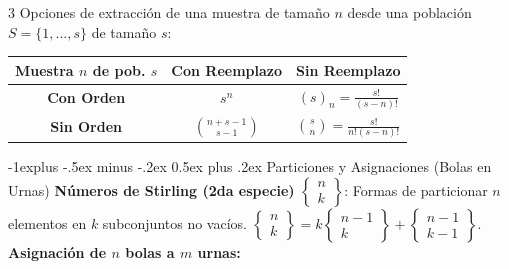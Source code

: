 \documentclass[10pt,landscape]{article}
\makeatletter
\renewcommand{\subsection}{\@startsection{subsection}{2}{0mm}%
                                {-1explus -.5ex minus -.2ex}%
                                {0.5ex plus .2ex}%
                                {\normalfont\normalsize\bfseries}}
\makeatother
\begin{document}
\begin{multicols*}{3}
Opciones de extracción de una muestra de tamaño $n$ desde una población $S = \{1,\dots,s\}$ de tamaño $s$:
\begin{center}
        \setlength{\extrarowheight}{7pt}
    \begin{tabular}{|c|c|c|}
    \hline
        \textbf{Muestra $n$ de pob. $s$} & \textbf{Con Reemplazo} & \textbf{Sin Reemplazo} \\ \hline
        \textbf{Con Orden} & $s^n$ & $(s)_n = \frac{s!}{(s-n)!}$ \\ \hline
        \textbf{Sin Orden} & $\binom{n+s-1}{s-1}$ & $\binom{s}{n} = \frac{s!}{n!(s-n)!}$ \\ \hline
    \end{tabular}
\end{center}

\subsection{Particiones y Asignaciones (Bolas en Urnas)}
\textbf{Números de Stirling (2da especie)} $\left\{\begin{matrix}n\\k\end{matrix}\right\}$: Formas de particionar $n$ elementos en $k$ subconjuntos no vacíos. $\left\{\begin{matrix}n\\k\end{matrix}\right\} = k\left\{\begin{matrix}n-1\\k\end{matrix}\right\} + \left\{\begin{matrix}n-1\\k-1\end{matrix}\right\}$.\\
\textbf{Asignación de $n$ bolas a $m$ urnas:}
\begin{center}
\end{center}


\end{multicols*}
\end{document}

